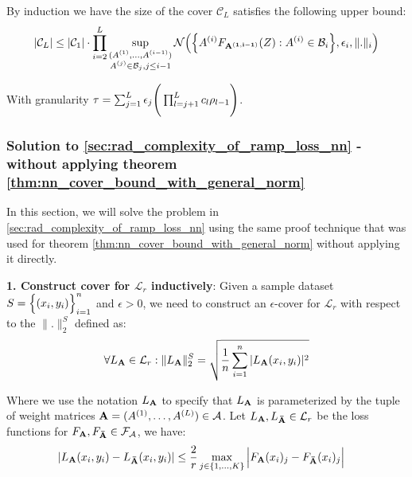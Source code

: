 \begin{proof*}
    \noindent By induction we have the size of the cover $\mathcal{C}_L$ satisfies the following upper bound:
    \begin{align*}
        |\mathcal{C}_L| \le |\mathcal{C}_1|\cdot\prod_{i=2}^L\sup_{
            \substack{
                (A^{(1)}, \dots, A^{(i-1)})\\
                A^{(j)}\in\mathcal{B}_j, j\le i-1
            }
        }\mathcal{N}\Big( 
            \Big\{ 
                A^{(i)}F_{\bf A^{(1, i-1)}}(Z) : A^{(i)}\in\mathcal{B}_i
             \Big\}, \epsilon_i, \|.\|_i
         \Big)
    \end{align*}

    \noindent With granularity $\tau=\sum_{j=1}^L\epsilon_j\Bigg( \prod_{l=j+1}^L c_l\rho_{l-1} \Bigg)$.
\end{proof*}


\subsubsection{Solution to \ref{sec:rad_complexity_of_ramp_loss_nn} - without applying theorem \ref{thm:nn_cover_bound_with_general_norm}}
\noindent In this section, we will solve the problem in \ref{sec:rad_complexity_of_ramp_loss_nn} using the same proof technique that was used for theorem \ref{thm:nn_cover_bound_with_general_norm} without applying it directly.

\noindent\newline\textbf{1. Construct cover for $\mathcal{L}_r$ inductively}: Given a sample dataset $S=\Big\{ (x_i, y_i) \Big\}_{i=1}^n$ and $\epsilon>0$, we need to construct an $\epsilon$-cover for $\mathcal{L}_r$ with respect to the $\|.\|_2^S$ defined as:
\begin{align*}
    \forall L_{\bf A} \in \mathcal{L}_r : \|L_{\bf A}\|_2^S = \sqrt{
        \frac{1}{n}\sum_{i=1}^n |L_{\bf A}(x_i, y_i)|^2
    }
\end{align*}

\noindent Where we use the notation $L_{\bf A}$ to specify that $L_{\bf A}$ is parameterized by the tuple of weight matrices ${\bf A}=(A^{(1)}, \dots, A^{(L)})\in\mathcal{A}$. Let $L_{\bf A},L_{\bf \bar A}\in\mathcal{L}_r$ be the loss functions for $F_{\bf A}, F_{\bf \bar A}\in\mathcal{F}_\mathcal{A}$, we have:
\begin{align*}
    |L_{\bf A}(x_i, y_i) - L_{\bf \bar A}(x_i, y_i)| &\le \frac{2}{r}\max_{j\in\{1, \dots, K\}} \Big| 
        F_{\bf A}(x_i)_j - F_{\bf \bar A}(x_i)_j
     \Big|
\end{align*}

